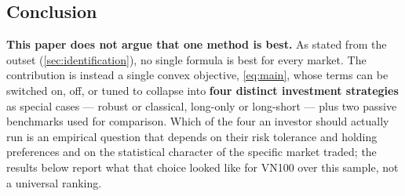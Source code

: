 \subsection{Conclusion}

\textbf{This paper does not argue that one method is best.} As stated from the outset
(\cref{sec:identification}), no single formula is best for every market. The contribution is
instead a single convex objective, \cref{eq:main}, whose terms can be switched on, off, or tuned
to collapse into \textbf{four distinct investment strategies} as special cases --- robust or
classical, long-only or long-short --- plus two passive benchmarks used for comparison. Which of
the four an investor should actually run is an empirical question that depends on their risk
tolerance and holding preferences and on the statistical character of the specific market traded;
the results below report what that choice looked like for VN100 over this sample, not a universal
ranking.

